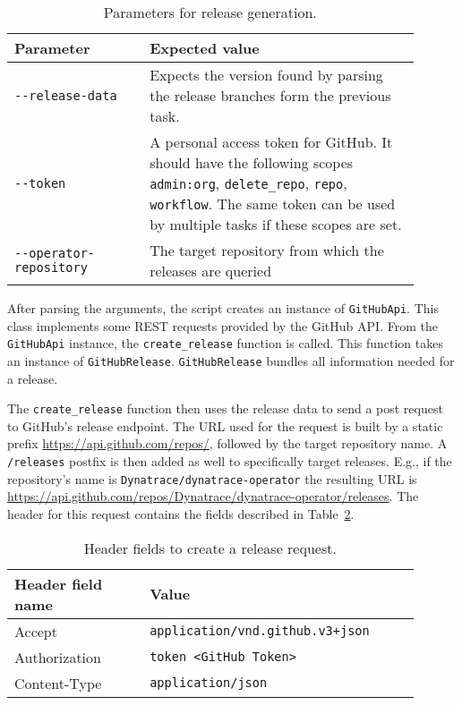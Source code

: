 \begin{table}[H]
    \centering
    \caption{Parameters for release generation.}
    \label{tab:parameters-for-release-generation}
    \begin{tabular}{p{0.3\linewidth}|p{0.6\linewidth}}
        Parameter & Expected value \\
        \hline
        \verb|--release-data| & Expects the version found by parsing the release branches form the previous task. \\
        \verb|--token| & A personal access token for GitHub.
            It should have the following scopes \verb|admin:org|, \verb|delete_repo|, \verb|repo|, \verb|workflow|.
            The same token can be used by multiple tasks if these scopes are set. \\
        \verb|--operator-repository| & The target repository from which the releases are queried \\
    \end{tabular}
\end{table}

After parsing the arguments, the script creates an instance of \verb|GitHubApi|.
This class implements some REST requests provided by the GitHub API.
From the \verb|GitHubApi| instance, the \verb|create_release| function is called.
This function takes an instance of \verb|GitHubRelease|.
\verb|GitHubRelease| bundles all information needed for a release.

The \verb|create_release| function then uses the release data to send a post request to GitHub's release endpoint.
The URL used for the request is built by a static prefix \url{https://api.github.com/repos/}, followed by the target repository name.
A \verb|/releases| postfix is then added as well to specifically target releases.
E.g., if the repository's name is \verb|Dynatrace/dynatrace-operator| the resulting URL is \url{https://api.github.com/repos/Dynatrace/dynatrace-operator/releases}.
The header for this request contains the fields described in Table~\ref{tab:header-fields-to-create-a-release-request}.

\begin{table}[H]
    \centering
    \caption{Header fields to create a release request.}
    \label{tab:header-fields-to-create-a-release-request}
    \begin{tabular}{p{0.3\linewidth}|p{0.6\linewidth}}
        Header field name & Value \\
        \hline
        Accept & \verb|application/vnd.github.v3+json|  \\
        Authorization & \verb|token <GitHub Token>| \\
        Content-Type & \verb|application/json| \\
    \end{tabular}
\end{table}

